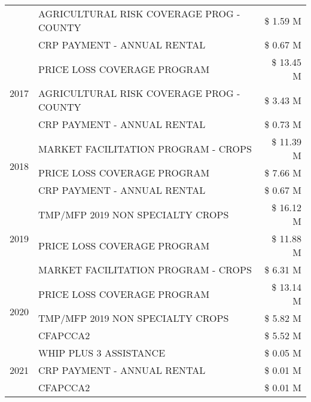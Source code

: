 \begin{tabular}{llr}
 & AGRICULTURAL RISK COVERAGE PROG - COUNTY      & \$ 1.59 M \\
 & CRP PAYMENT - ANNUAL RENTAL                   & \$ 0.67 M \\
\cline{1-3}
\multirow[t]{3}{*}{2017} & PRICE LOSS COVERAGE PROGRAM & \$ 13.45 M \\
 & AGRICULTURAL RISK COVERAGE PROG - COUNTY & \$ 3.43 M \\
 & CRP PAYMENT - ANNUAL RENTAL & \$ 0.73 M \\
\cline{1-3}
\multirow[t]{3}{*}{2018} & MARKET FACILITATION PROGRAM - CROPS & \$ 11.39 M \\
 & PRICE LOSS COVERAGE PROGRAM & \$ 7.66 M \\
 & CRP PAYMENT - ANNUAL RENTAL & \$ 0.67 M \\
\cline{1-3}
\multirow[t]{3}{*}{2019} & TMP/MFP 2019 NON SPECIALTY CROPS & \$ 16.12 M \\
 & PRICE LOSS COVERAGE PROGRAM & \$ 11.88 M \\
 & MARKET FACILITATION PROGRAM - CROPS & \$ 6.31 M \\
\cline{1-3}
\multirow[t]{3}{*}{2020} & PRICE LOSS COVERAGE PROGRAM & \$ 13.14 M \\
 & TMP/MFP 2019 NON SPECIALTY CROPS & \$ 5.82 M \\
 & CFAPCCA2 & \$ 5.52 M \\
\cline{1-3}
\multirow[t]{3}{*}{2021} & WHIP PLUS 3 ASSISTANCE & \$ 0.05 M \\
 & CRP PAYMENT - ANNUAL RENTAL & \$ 0.01 M \\
 & CFAPCCA2 & \$ 0.01 M \\
\cline{1-3}
\bottomrule
\end{tabular}
